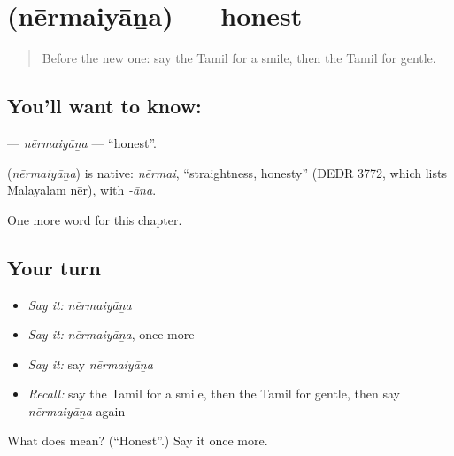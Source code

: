 \section[\texorpdfstring{\ta{நேர்மையான} (nērmaiyāṉa)}{நேர்மையான (nērmaiyāṉa)}]{ (nērmaiyāṉa) — honest}

\label{lesson:TA-C268-nermaiyana}



\begin{quote}
Before the new one: say the Tamil for a smile, then the Tamil for gentle.
\end{quote}

\subsection*{You'll want to know: }
\textbf{} — \emph{nērmaiyāṉa} — \textquotedblleft{}honest\textquotedblright{}.

\begin{cousinweb}
\textbf{} (\emph{nērmaiyāṉa}) is native: \emph{nērmai}, \textquotedblleft{}straightness, honesty\textquotedblright{} (DEDR 3772, which lists Malayalam nēr), with \emph{-āṉa}.
\end{cousinweb}

\begin{grammarlens}[title={What you've built}]
One more word for this chapter.
\end{grammarlens}

\subsection*{Your turn}
\begin{itemize}
\raggedright
  \item \emph{Say it:} \emph{nērmaiyāṉa}
  \item \emph{Say it:} \emph{nērmaiyāṉa}, once more
  \item \emph{Say it:} say \emph{nērmaiyāṉa}
  \item \emph{Recall:} say the Tamil for a smile, then the Tamil for gentle, then say \emph{nērmaiyāṉa} again
\end{itemize}

\begin{tcolorbox}[breakable,colback=teal!4,colframe=teal!35!black,title={Before you move on}]
What does  mean? (\textquotedblleft{}Honest\textquotedblright{}.) Say it once more.
\end{tcolorbox}
